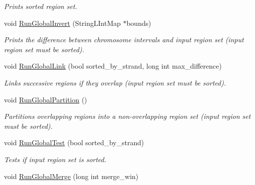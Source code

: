 \begin{DoxyCompactItemize}
\begin{DoxyCompactList}\small\item\em Prints sorted region set. \end{DoxyCompactList}\item 
\hypertarget{classGenomicRegionSet_a1056659ccda2e39febb6b87d858a88c4}{
void \hyperlink{classGenomicRegionSet_a1056659ccda2e39febb6b87d858a88c4}{RunGlobalInvert} (StringLIntMap $\ast$bounds)}
\label{classGenomicRegionSet_a1056659ccda2e39febb6b87d858a88c4}

\begin{DoxyCompactList}\small\item\em Prints the difference between chromosome intervals and input region set (input region set must be sorted). \end{DoxyCompactList}\item 
\hypertarget{classGenomicRegionSet_ab9783fb4fead289c7fe107f9bec1865b}{
void \hyperlink{classGenomicRegionSet_ab9783fb4fead289c7fe107f9bec1865b}{RunGlobalLink} (bool sorted\_\-by\_\-strand, long int max\_\-difference)}
\label{classGenomicRegionSet_ab9783fb4fead289c7fe107f9bec1865b}

\begin{DoxyCompactList}\small\item\em Links successive regions if they overlap (input region set must be sorted). \end{DoxyCompactList}\item 
\hypertarget{classGenomicRegionSet_a40dd79548f9d0333f1169bd17a6e9465}{
void \hyperlink{classGenomicRegionSet_a40dd79548f9d0333f1169bd17a6e9465}{RunGlobalPartition} ()}
\label{classGenomicRegionSet_a40dd79548f9d0333f1169bd17a6e9465}

\begin{DoxyCompactList}\small\item\em Partitions overlapping regions into a non-\/overlapping region set (input region set must be sorted). \end{DoxyCompactList}\item 
\hypertarget{classGenomicRegionSet_a83853c6af4b779a37de284751d09348d}{
void \hyperlink{classGenomicRegionSet_a83853c6af4b779a37de284751d09348d}{RunGlobalTest} (bool sorted\_\-by\_\-strand)}
\label{classGenomicRegionSet_a83853c6af4b779a37de284751d09348d}

\begin{DoxyCompactList}\small\item\em Tests if input region set is sorted. \end{DoxyCompactList}\item 
\hypertarget{classGenomicRegionSet_a53885e10c5dc9aa51ebece77dae63313}{
void \hyperlink{classGenomicRegionSet_a53885e10c5dc9aa51ebece77dae63313}{RunGlobalMerge} (long int merge\_\-win)}
\label{classGenomicRegionSet_a53885e10c5dc9aa51ebece77dae63313}


\end{DoxyCompactItemize}
